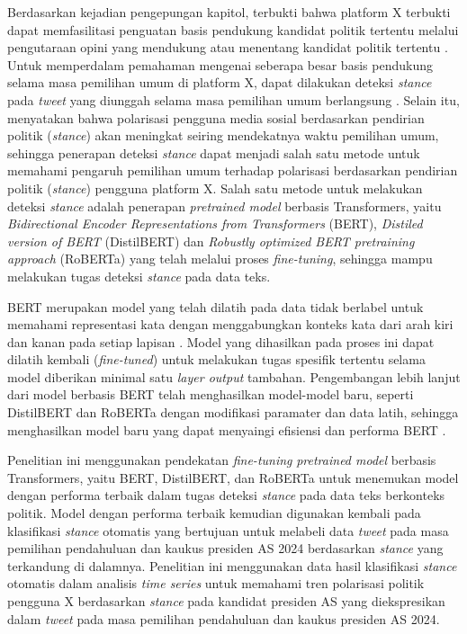 \documentclass[journal]{IEEEtran}
\begin{document}
Berdasarkan kejadian pengepungan kapitol, terbukti bahwa platform X terbukti dapat memfasilitasi penguatan basis pendukung kandidat politik tertentu melalui pengutaraan opini yang mendukung atau menentang kandidat politik tertentu \cite{stolee2018twitter}. Untuk memperdalam pemahaman mengenai seberapa besar basis pendukung selama masa pemilihan umum di platform X, dapat dilakukan deteksi \textit{stance} pada \textit{tweet} yang diunggah selama masa pemilihan umum berlangsung \cite{grimminger2021hate}. Selain itu, \cite{garcia2015ideological} menyatakan bahwa polarisasi pengguna media sosial berdasarkan pendirian politik (\textit{stance}) akan meningkat seiring mendekatnya waktu pemilihan umum, sehingga penerapan deteksi \textit{stance} dapat menjadi salah satu metode untuk memahami pengaruh pemilihan umum terhadap polarisasi berdasarkan pendirian politik (\textit{stance}) pengguna platform X. Salah satu metode untuk melakukan deteksi \textit{stance} adalah penerapan \textit{pretrained model} berbasis Transformers, yaitu \textit{Bidirectional Encoder Representations from Transformers} (BERT), \textit{Distiled version of BERT} (DistilBERT) dan \textit{Robustly optimized BERT pretraining approach} (RoBERTa) yang telah melalui proses \textit{fine-tuning}, sehingga mampu melakukan tugas deteksi \textit{stance} pada data teks.

BERT merupakan model yang telah dilatih pada data tidak berlabel untuk memahami representasi kata dengan menggabungkan konteks kata dari arah kiri dan kanan pada setiap lapisan \cite{devlin2018bert}. Model yang dihasilkan pada proses ini dapat dilatih kembali (\textit{fine-tuned}) untuk melakukan tugas spesifik tertentu selama model diberikan minimal satu \textit{layer output} tambahan. Pengembangan lebih lanjut dari model berbasis BERT telah menghasilkan model-model baru, seperti DistilBERT dan RoBERTa dengan modifikasi paramater dan data latih, sehingga menghasilkan model baru yang dapat menyaingi efisiensi dan performa BERT \cite{sanh2019distilbert, liu2019roberta}.

Penelitian ini menggunakan pendekatan \textit{fine-tuning} \textit{pretrained model} berbasis Transformers, yaitu BERT, DistilBERT, dan RoBERTa untuk menemukan model dengan performa terbaik dalam tugas deteksi \textit{stance} pada data teks berkonteks politik. Model dengan performa terbaik kemudian digunakan kembali pada klasifikasi \textit{stance} otomatis yang bertujuan untuk melabeli data \textit{tweet} pada masa pemilihan pendahuluan dan kaukus presiden AS 2024 berdasarkan \textit{stance} yang terkandung di dalamnya. Penelitian ini menggunakan data hasil klasifikasi \textit{stance} otomatis dalam analisis \textit{time series} untuk memahami tren polarisasi politik pengguna X berdasarkan \textit{stance} pada kandidat presiden AS yang diekspresikan dalam \textit{tweet} pada masa pemilihan pendahuluan dan kaukus presiden AS 2024.
\end{document}
